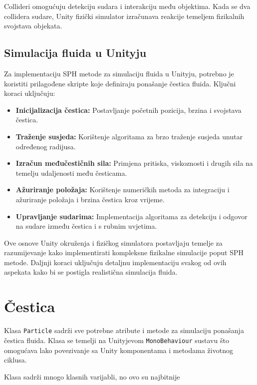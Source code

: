 \documentclass[diplomskirad]{fer}
\begin{document}
    Collideri omogućuju detekciju sudara i interakciju među objektima.
    Kada se dva collidera sudare, Unity fizički simulator izračunava reakcije temeljem fizikalnih svojstava objekata.

    \subsection{Simulacija fluida u Unityju}\label{subsec:simulacija-fluida-u-unityju}
    Za implementaciju SPH metode za simulaciju fluida u Unityju, potrebno je koristiti prilagođene skripte koje definiraju ponašanje čestica fluida.
    Ključni koraci uključuju:
    \begin{itemize}
        \item \textbf{Inicijalizacija čestica:} Postavljanje početnih pozicija, brzina i svojstava čestica.
        \item \textbf{Traženje susjeda:} Korištenje algoritama za brzo traženje susjeda unutar određenog radijusa.
        \item \textbf{Izračun međučestičnih sila:} Primjena pritiska, viskoznosti i drugih sila na temelju udaljenosti među česticama.
        \item \textbf{Ažuriranje položaja:} Korištenje numeričkih metoda za integraciju i ažuriranje položaja i brzina čestica kroz vrijeme.
        \item \textbf{Upravljanje sudarima:} Implementacija algoritama za detekciju i odgovor na sudare između čestica i s rubnim uvjetima.
    \end{itemize}

    Ove osnove Unity okruženja i fizičkog simulatora postavljaju temelje za razumijevanje kako implementirati kompleksne fizikalne simulacije poput SPH metode. Daljnji koraci uključuju detaljnu implementaciju svakog od ovih aspekata kako bi se postigla realistična simulacija fluida.


    \section{Čestica}\label{sec:cestica}

    Klasa \texttt{Particle} sadrži sve potrebne atribute i metode za simulaciju ponašanja čestica fluida.
    Klasa se temelji na Unityjevom \texttt{MonoBehaviour} sustavu što omogućava lako povezivanje sa Unity komponentama i metodama životnog ciklusa.

    Klasa sadrži mnogo klasnih varijabli, no ovo su najbitnije
\end{document}
